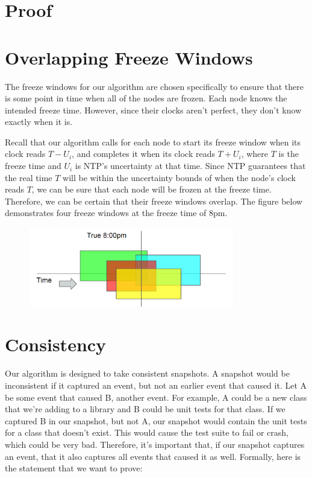 \section{Proof}
\label{sec:proof}

\section{Overlapping Freeze Windows}

The freeze windows for our algorithm are chosen specifically to ensure
that there is some point in time when all of the nodes are
frozen. Each node knows the intended freeze time. However, since their
clocks aren’t perfect, they don’t know exactly when it is.

Recall that our algorithm calls for each node to start its freeze
window when its clock reads $T - U_i$, and completes it when its clock
reads $T + U_i$, where $T$ is the freeze time and $U_i$ is NTP’s uncertainty
at that time. Since NTP guarantees that the real time $T$ will be within
the uncertainty bounds of when the node’s clock reads $T$, we can be
sure that each node will be frozen at the freeze time. Therefore, we
can be certain that their freeze windows overlap. The figure below
demonstrates four freeze windows at the freeze time of 8pm.

\begin{figure}[h]
  \centering
  \includegraphics[width=0.8\textwidth]{overlapping-windows.png}
\end{figure}

\section{Consistency}

Our algorithm is designed to take consistent snapshots. A snapshot
would be inconsistent if it captured an event, but not an earlier
event that caused it. Let A be some event that caused B, another
event. For example, A could be a new class that we’re adding to a
library and B could be unit tests for that class. If we captured B in
our snapshot, but not A, our snapshot would contain the unit tests for
a class that doesn’t exist. This would cause the test suite to fail or
crash, which could be very bad. Therefore, it’s important that, if our
snapshot captures an event, that it also captures all events that
caused it as well. Formally, here is the statement that we want to
prove:

